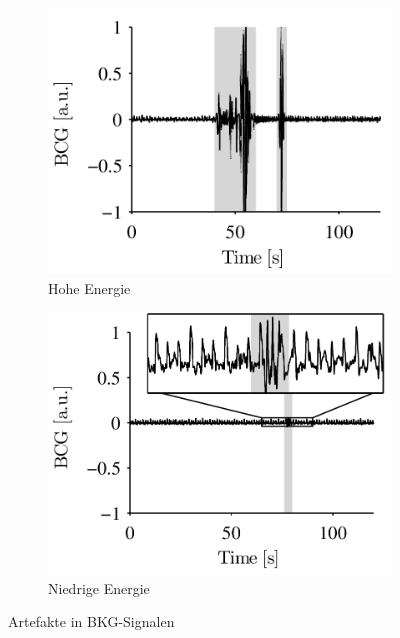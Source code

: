 	\begin{figure}[H]
		\centering
		\begin{subfigure}{0.48\linewidth}
			\centering
      		\includegraphics[width=\textwidth]{pic/high-energy-artifacts.png}
			\caption{Hohe Energie}
			\label{fig:high-energy-artifact}
    	\end{subfigure}
    	\hfill
    	\begin{subfigure}{0.48\linewidth}
    		\centering
      		\includegraphics[width=\textwidth]{pic/low-energy-artifacts.png}
			\caption{Niedrige Energie}
			\label{fig:low-energy-artifact}
    	\end{subfigure}
    	\caption{Artefakte in \ac{BKG}-Signalen}
	\end{figure} %
	
